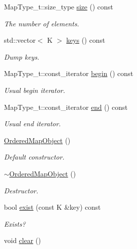\begin{DoxyCompactItemize}
Map\+Type\+\_\+t\+::size\+\_\+type \mbox{\hyperlink{classADAT_1_1OrderedMapObject_a3d96d76de0ad61fb858509543c3f60f4}{size}} () const
\begin{DoxyCompactList}\small\item\em The number of elements. \end{DoxyCompactList}\item 
std\+::vector$<$ K $>$ \mbox{\hyperlink{classADAT_1_1OrderedMapObject_ad376a69c5761afe8fe44d3a24c44ba4c}{keys}} () const
\begin{DoxyCompactList}\small\item\em Dump keys. \end{DoxyCompactList}\item 
Map\+Type\+\_\+t\+::const\+\_\+iterator \mbox{\hyperlink{classADAT_1_1OrderedMapObject_afe44774d4a446c8f66ea5d6bd2c5d59f}{begin}} () const
\begin{DoxyCompactList}\small\item\em Usual begin iterator. \end{DoxyCompactList}\item 
Map\+Type\+\_\+t\+::const\+\_\+iterator \mbox{\hyperlink{classADAT_1_1OrderedMapObject_ae6ad157b81bdf303beaee4422f313ed4}{end}} () const
\begin{DoxyCompactList}\small\item\em Usual end iterator. \end{DoxyCompactList}\item 
\mbox{\hyperlink{classADAT_1_1OrderedMapObject_ac9ea7852b3e405d4e0c6744626cb6f24}{Ordered\+Map\+Object}} ()
\begin{DoxyCompactList}\small\item\em Default constructor. \end{DoxyCompactList}\item 
\mbox{\hyperlink{classADAT_1_1OrderedMapObject_a255777a3e2ecc4482ad8d2adf630a8d2}{$\sim$\+Ordered\+Map\+Object}} ()
\begin{DoxyCompactList}\small\item\em Destructor. \end{DoxyCompactList}\item 
bool \mbox{\hyperlink{classADAT_1_1OrderedMapObject_a1300311ab06f03aba77a5911d0017caf}{exist}} (const K \&key) const
\begin{DoxyCompactList}\small\item\em Exists? \end{DoxyCompactList}\item 
void \mbox{\hyperlink{classADAT_1_1OrderedMapObject_a5bf5e1a45535f8277499ac9a149a2b26}{clear}} ()

\end{DoxyCompactItemize}
